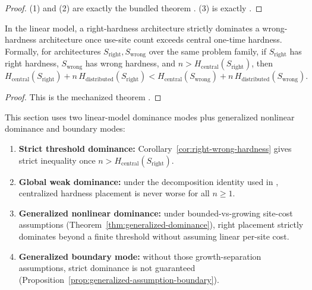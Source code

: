 \begin{proof}
(1) and (2) are exactly the bundled theorem
.
(3) is exactly
.
\end{proof}

\begin{corollary}\label{cor:right-wrong-hardness}
In the linear model, a right-hardness architecture strictly dominates a wrong-hardness architecture once use-site count exceeds central one-time hardness. Formally, for architectures $S_{\mathrm{right}}, S_{\mathrm{wrong}}$ over the same problem family, if $S_{\mathrm{right}}$ has right hardness, $S_{\mathrm{wrong}}$ has wrong hardness, and $n > H_{\mathrm{central}}(S_{\mathrm{right}})$, then
\[
H_{\mathrm{central}}(S_{\mathrm{right}}) + n\,H_{\mathrm{distributed}}(S_{\mathrm{right}})
<
H_{\mathrm{central}}(S_{\mathrm{wrong}}) + n\,H_{\mathrm{distributed}}(S_{\mathrm{wrong}}).
\]
\end{corollary}

\begin{proof}
This is the mechanized theorem .
\end{proof}

\begin{proposition}\label{prop:dominance-modes}
This section uses two linear-model dominance modes plus generalized nonlinear dominance and boundary modes:
\begin{enumerate}
\item \textbf{Strict threshold dominance:} Corollary~\ref{cor:right-wrong-hardness} gives strict inequality once $n > H_{\mathrm{central}}(S_{\mathrm{right}})$.
\item \textbf{Global weak dominance:} under the decomposition identity used in , centralized hardness placement is never worse for all $n\ge 1$.
\item \textbf{Generalized nonlinear dominance:} under bounded-vs-growing site-cost assumptions (Theorem~\ref{thm:generalized-dominance}), right placement strictly dominates beyond a finite threshold without assuming linear per-site cost.
\item \textbf{Generalized boundary mode:} without those growth-separation assumptions, strict dominance is not guaranteed (Proposition~\ref{prop:generalized-assumption-boundary}).
\end{enumerate}
\end{proposition}

